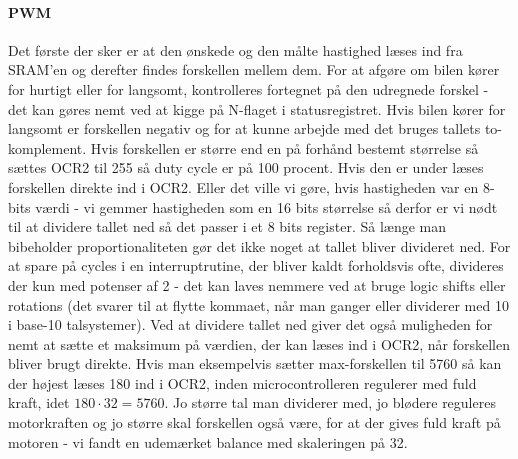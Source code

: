 \paragraph{PWM}
Det første der sker er at den ønskede og den målte hastighed læses ind fra SRAM'en og derefter findes forskellen mellem dem. For at afgøre om bilen kører for hurtigt eller for langsomt, kontrolleres fortegnet på den udregnede forskel - det kan gøres nemt ved at kigge på N-flaget i statusregistret. Hvis bilen kører for langsomt er forskellen negativ og for at kunne arbejde med det bruges tallets to-komplement. Hvis forskellen er større end en på forhånd bestemt størrelse så sættes OCR2 til 255 så duty cycle er på 100 procent. Hvis den er under læses forskellen direkte ind i OCR2. Eller det ville vi gøre, hvis hastigheden var en 8-bits værdi - vi gemmer hastigheden som en 16 bits størrelse så derfor er vi nødt til at dividere tallet ned så det passer i et 8 bits register. Så længe man bibeholder proportionaliteten gør det ikke noget at tallet bliver divideret ned. For at spare på cycles i en interruptrutine, der bliver kaldt forholdsvis ofte, divideres der kun med potenser af 2 - det kan laves nemmere ved at bruge logic shifts eller rotations (det svarer til at flytte kommaet, når man ganger eller dividerer med 10 i base-10 talsystemer). Ved at dividere tallet ned giver det også muligheden for nemt at sætte et maksimum på værdien, der kan læses ind i OCR2, når forskellen bliver brugt direkte. Hvis man eksempelvis sætter max-forskellen til 5760 så kan der højest læses 180 ind i OCR2, inden microcontrolleren regulerer med fuld kraft, idet $180 \cdot 32 = 5760$. Jo større tal man dividerer med, jo blødere reguleres motorkraften og jo større skal forskellen også være, for at der gives fuld kraft på motoren - vi fandt en udemærket balance med skaleringen på 32.\\

